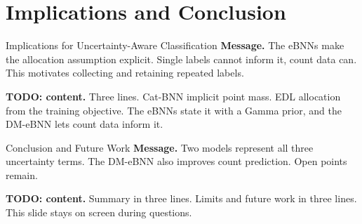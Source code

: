 
\section{Implications and Conclusion}

\begin{frame}{Implications for Uncertainty-Aware Classification}
	\textbf{Message.} The eBNNs make the allocation assumption explicit. Single labels cannot inform it, count data can. This motivates collecting and retaining repeated labels.

	\medskip
	\textbf{TODO: content.} Three lines. Cat-BNN implicit point mass. EDL allocation from the training objective. The eBNNs state it with a Gamma prior, and the DM-eBNN lets count data inform it.
\end{frame}

\begin{frame}{Conclusion and Future Work}
	\textbf{Message.} Two models represent all three uncertainty terms. The DM-eBNN also improves count prediction. Open points remain.

	\medskip
	\textbf{TODO: content.} Summary in three lines. Limits and future work in three lines. This slide stays on screen during questions.
\end{frame}
